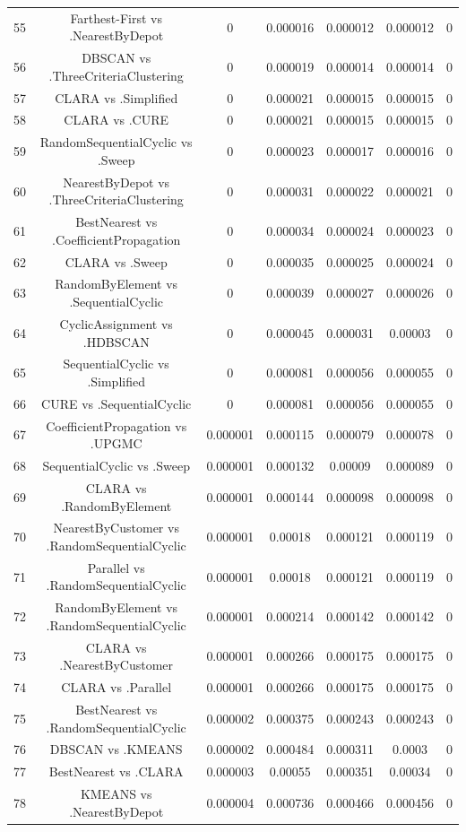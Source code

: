 \documentclass[a4paper,10pt]{article}
\begin{document}
\begin{landscape}
\begin{table}[!htp]
\begin{tabular}{ccccccc}
55&Farthest-First vs .NearestByDepot&0&0.000016&0.000012&0.000012&0\\
56&DBSCAN vs .ThreeCriteriaClustering&0&0.000019&0.000014&0.000014&0\\
57&CLARA vs .Simplified&0&0.000021&0.000015&0.000015&0\\
58&CLARA vs .CURE&0&0.000021&0.000015&0.000015&0\\
59&RandomSequentialCyclic vs .Sweep&0&0.000023&0.000017&0.000016&0\\
60&NearestByDepot vs .ThreeCriteriaClustering&0&0.000031&0.000022&0.000021&0\\
61&BestNearest vs .CoefficientPropagation&0&0.000034&0.000024&0.000023&0\\
62&CLARA vs .Sweep&0&0.000035&0.000025&0.000024&0\\
63&RandomByElement vs .SequentialCyclic&0&0.000039&0.000027&0.000026&0\\
64&CyclicAssignment vs .HDBSCAN&0&0.000045&0.000031&0.00003&0\\
65&SequentialCyclic vs .Simplified&0&0.000081&0.000056&0.000055&0\\
66&CURE vs .SequentialCyclic&0&0.000081&0.000056&0.000055&0\\
67&CoefficientPropagation vs .UPGMC&0.000001&0.000115&0.000079&0.000078&0\\
68&SequentialCyclic vs .Sweep&0.000001&0.000132&0.00009&0.000089&0\\
69&CLARA vs .RandomByElement&0.000001&0.000144&0.000098&0.000098&0\\
70&NearestByCustomer vs .RandomSequentialCyclic&0.000001&0.00018&0.000121&0.000119&0\\
71&Parallel vs .RandomSequentialCyclic&0.000001&0.00018&0.000121&0.000119&0\\
72&RandomByElement vs .RandomSequentialCyclic&0.000001&0.000214&0.000142&0.000142&0\\
73&CLARA vs .NearestByCustomer&0.000001&0.000266&0.000175&0.000175&0\\
74&CLARA vs .Parallel&0.000001&0.000266&0.000175&0.000175&0\\
75&BestNearest vs .RandomSequentialCyclic&0.000002&0.000375&0.000243&0.000243&0\\
76&DBSCAN vs .KMEANS&0.000002&0.000484&0.000311&0.0003&0\\
77&BestNearest vs .CLARA&0.000003&0.00055&0.000351&0.00034&0\\
78&KMEANS vs .NearestByDepot&0.000004&0.000736&0.000466&0.000456&0\\

\end{tabular}
\end{table}
\end{landscape}
\end{document}

